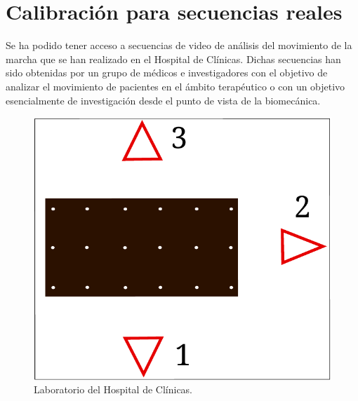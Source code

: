 
\section{Calibración para secuencias reales}

\label{seccion_calibracion_secuencias_reales}


Se ha podido tener acceso a secuencias de video de análisis del movimiento de la marcha que se han realizado en el Hospital de Clínicas. Dichas secuencias han sido obtenidas por un grupo de médicos e investigadores con el objetivo de analizar el movimiento de pacientes en el ámbito terapéutico o con un objetivo esencialmente de investigación desde el punto de vista de la biomecánica.

\vspace{-0.3cm}
\begin{figure}[ht!]
\centering
\includegraphics[scale=0.5]{img/calibracion/lab_real.pdf}
\vspace{-0.3cm}
\caption{Laboratorio del Hospital de Clínicas.}
\label{fig: lab_real}
\end{figure}


